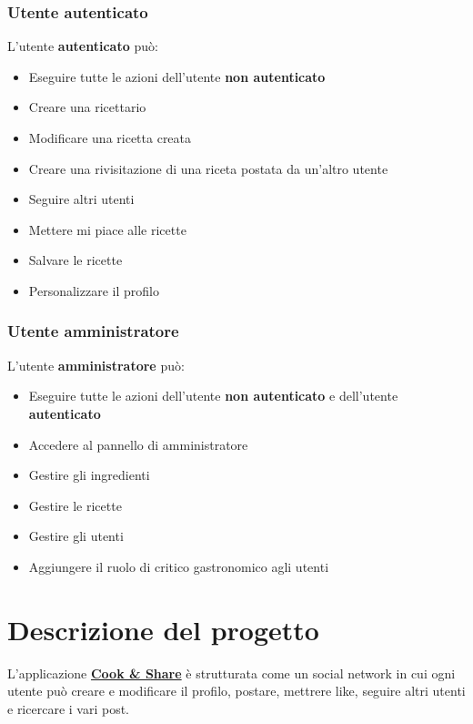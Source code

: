 \documentclass[a4paper]{article}
\begin{document}
            \subsubsection{Utente autenticato}
                L'utente \textbf{autenticato} può:
                \begin{itemize}
                    \item Eseguire tutte le azioni dell'utente \textbf{non autenticato}
                    \item Creare una ricettario
                    \item Modificare una ricetta creata
                    \item Creare una rivisitazione di una riceta postata da un'altro utente
                    \item Seguire altri utenti
                    \item Mettere mi piace alle ricette
                    \item Salvare le ricette
                    \item Personalizzare il profilo
                \end{itemize}
            
            
            \subsubsection{Utente amministratore}
                L'utente \textbf{amministratore} può:
                \begin{itemize}
                    \item Eseguire tutte le azioni dell'utente \textbf{non autenticato} e dell'utente \textbf{autenticato}
                    \item Accedere al pannello di amministratore
                    \item Gestire gli ingredienti
                    \item Gestire le ricette
                    \item Gestire gli utenti
                    \item Aggiungere il ruolo di critico gastronomico agli utenti
                \end{itemize}
    
    
    \newpage
    \section{Descrizione del progetto}
        L'applicazione \href{https://github.com/LinkIT3/Progetto_Tec-Web}{\textbf{Cook \& Share}} è strutturata come un social network in cui ogni utente può creare e modificare il profilo,
        postare, mettrere like, seguire altri utenti e ricercare i vari post.
        
\end{document}
